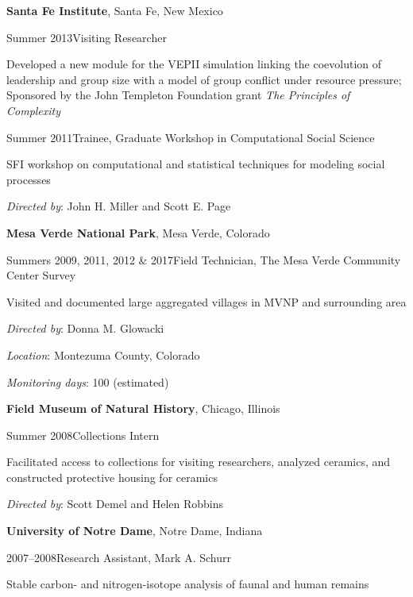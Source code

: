 {\bf Santa Fe Institute}, Santa Fe, New Mexico
\begin{list1}
\item[] Summer 2013\hspace{.2cm}Visiting Researcher
\begin{list2}
\item[] Developed a new module for the VEPII simulation linking the coevolution of leadership and group size with a model of group conflict under resource pressure; Sponsored by the John Templeton Foundation grant \emph{The Principles of Complexity}
\end{list2}
\end{list1}

\vspace{0.1in}

\begin{list1}
\item[] Summer 2011\hspace{.2cm}Trainee, Graduate Workshop in Computational Social Science
\begin{list2}
\item[] SFI workshop on computational and statistical techniques for modeling social processes
\item[] \emph{Directed by}: John H. Miller and Scott E. Page
\end{list2}
\end{list1}


{\bf Mesa Verde National Park}, Mesa Verde, Colorado
\begin{list1}
\item[] Summers 2009, 2011, 2012 \& 2017\hspace{.2cm}Field Technician, The Mesa Verde Community Center Survey
\begin{list2}
\item[] Visited and documented large aggregated villages in MVNP and surrounding area
\item[] \emph{Directed by}: Donna M. Glowacki
\item[] \emph{Location}: Montezuma County, Colorado
\item[] \emph{Monitoring days}: 100 (estimated)
\end{list2}
\end{list1}


{\bf Field Museum of Natural History}, Chicago, Illinois
\begin{list1}
\item[] Summer 2008\hspace{.2cm}Collections Intern
\begin{list2}
\item[] Facilitated access to collections for visiting researchers, analyzed ceramics, and constructed protective housing for ceramics
\item[] \emph{Directed by}: Scott Demel and Helen Robbins
\end{list2}
\end{list1}


{\bf University of Notre Dame}, Notre Dame, Indiana
\begin{list1}
\item[] 2007–2008\hspace{.2cm}Research Assistant, Mark A. Schurr
\begin{list2}
\item[] Stable carbon- and nitrogen-isotope analysis of faunal and human remains
\end{list2}
\end{list1}


